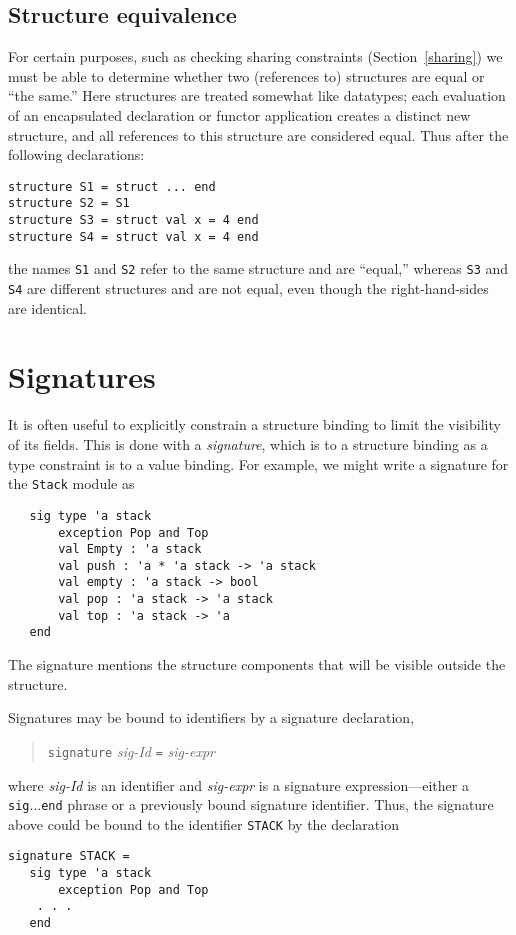 \subsection{Structure equivalence}
For certain purposes, such as checking sharing constraints
(Section~\ref{sharing}) we must be able to determine whether two
(references to) structures are equal or ``the same.''  Here
structures are treated somewhat like datatypes; each evaluation of an
encapsulated declaration or functor application creates a distinct
new structure, and all references to this structure are considered
equal.  Thus after the following declarations:
\begin{verbatim}
structure S1 = struct ... end
structure S2 = S1
structure S3 = struct val x = 4 end
structure S4 = struct val x = 4 end
\end{verbatim}
the names \verb"S1" and \verb"S2" refer to the same structure and are
``equal,'' whereas \verb"S3" and \verb"S4" are different structures
and are not equal, even though the right-hand-sides are identical.

\section{Signatures}
It is often useful to explicitly constrain a structure binding to
limit the visibility of its fields.  This is done with a {\em
signature}, which is to a structure binding as a type constraint is to a
value binding.  For example, we might write a signature for the
\verb"Stack" module as
\begin{verbatim}
   sig type 'a stack
       exception Pop and Top
       val Empty : 'a stack
       val push : 'a * 'a stack -> 'a stack
       val empty : 'a stack -> bool
       val pop : 'a stack -> 'a stack
       val top : 'a stack -> 'a
   end
\end{verbatim}
The signature mentions the structure components that will be visible
outside the structure.

Signatures may be bound to identifiers by a signature declaration,
\begin{quote}
\verb"signature" {\it sig-Id} \verb"=" {\it sig-expr}
\end{quote}
where {\it sig-Id} is an identifier and {\it sig-expr} is a signature
expression---either a \verb"sig"...\verb"end" phrase or a previously
bound signature identifier.  Thus, the signature above could be bound
to the identifier \verb"STACK" by the declaration
\begin{verbatim}
signature STACK =
   sig type 'a stack
       exception Pop and Top
	. . .
   end
\end{verbatim}

